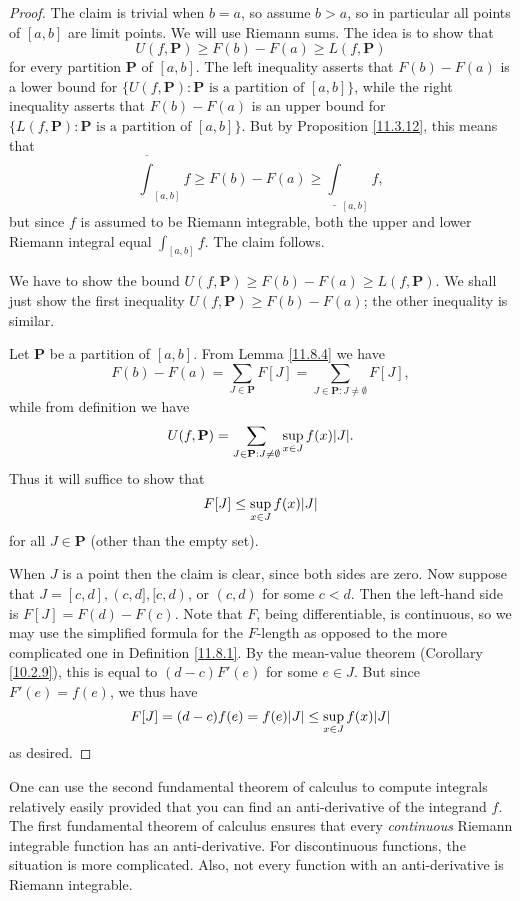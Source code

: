 \begin{proof}
    The claim is trivial when \(b = a\), so assume \(b > a\), so in particular all points of \([a, b]\) are limit points.
    We will use Riemann sums.
    The idea is to show that
    \[
        U(f, \mathbf{P}) \geq F(b) - F(a) \geq L(f, \mathbf{P})
    \]
    for every partition \(\mathbf{P}\) of \([a, b]\).
    The left inequality asserts that \(F(b) - F(a)\) is a lower bound for \(\{U(f, \mathbf{P}) : \mathbf{P} \text{ is a partition of } [a, b]\}\), while the right inequality asserts that \(F(b) - F(a)\) is an upper bound for \(\{L(f, \mathbf{P}) : \mathbf{P} \text{ is a partition of } [a, b]\}\).
    But by Proposition \ref{11.3.12}, this means that
    \[
        \overline{\int}_{[a, b]} f \geq F(b) - F(a) \geq \underline{\int}_{[a, b]} f,
    \]
    but since \(f\) is assumed to be Riemann integrable, both the upper and lower Riemann integral equal \(\int_{[a, b]} f\).
    The claim follows.

    We have to show the bound \(U(f, \mathbf{P}) \geq F(b) - F(a) \geq L(f, \mathbf{P})\).
    We shall just show the first inequality \(U(f, \mathbf{P}) \geq F(b) - F(a)\);
    the other inequality is similar.

    Let \(\mathbf{P}\) be a partition of \([a, b]\).
    From Lemma \ref{11.8.4} we have
    \[
        F(b) - F(a) = \sum_{J \in \mathbf{P}} F[J] = \sum_{J \in \mathbf{P} : J \neq \emptyset} F[J],
    \]
    while from definition we have
    \[
        U(f, \mathbf{P}) = \sum_{J \in \mathbf{P} : J \neq \emptyset} \sup_{x \in J} f(x) \abs*{J}.
    \]
    Thus it will suffice to show that
    \[
        F[J] \leq \sup_{x \in J} f(x) \abs*{J}
    \]
    for all \(J \in \mathbf{P}\)
    (other than the empty set).

    When \(J\) is a point then the claim is clear, since both sides are zero.
    Now suppose that \(J = [c, d], (c, d], [c, d)\), or \((c, d)\) for some \(c < d\).
    Then the left-hand side is \(F[J] = F(d) - F(c)\).
    Note that \(F\), being differentiable, is continuous, so we may use the simplified formula for the \(F\)-length as opposed to the more complicated one in Definition \ref{11.8.1}.
    By the mean-value theorem (Corollary \ref{10.2.9}), this is equal to \((d - c) F'(e)\) for some \(e \in J\).
    But since \(F'(e) = f(e)\), we thus have
    \[
        F[J] = (d - c) f(e) = f(e) \abs*{J} \leq \sup_{x \in J} f(x) \abs*{J}
    \]
    as desired.
\end{proof}

\begin{note}
    One can use the second fundamental theorem of calculus to compute integrals relatively easily provided that you can find an anti-derivative of the integrand \(f\).
    The first fundamental theorem of calculus ensures that every \emph{continuous} Riemann integrable function has an anti-derivative.
    For discontinuous functions, the situation is more complicated.
    Also, not every function with an anti-derivative is Riemann integrable.
\end{note}

